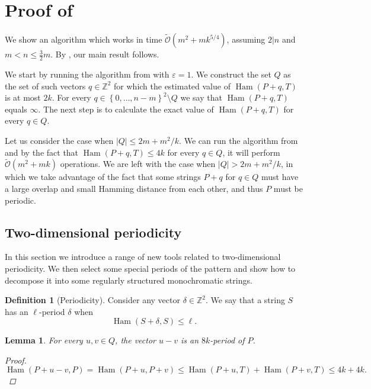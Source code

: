 \documentclass[11pt]{article}
\newcommand{\Z}{\mathbb{Z}}
\newcommand{\tO}{\tilde{\mathcal{O}}}
\newcommand{\set}[1]{\left\lbrace #1 \right\rbrace}
\theoremstyle{plain}
\newtheorem{lemma}{Lemma}
\theoremstyle{definition}
\newtheorem{definition}{Definition}
\theoremstyle{remark}
\DeclareMathOperator*{\Ham}{Ham}
\begin{document}
\section{Proof of }
We show an algorithm which works in time $\tO(m^2 + mk^{5/4})$, assuming $2|n$ and $m < n \le \frac{3}{2}m$.
By , our main result follows.

We start by running the algorithm from  with $\varepsilon = 1$.
We construct the set $Q$ as the set of such vectors $q \in \Z^2$ for which the estimated value of $\Ham(P + q, T)$ is at most $2k$.
For every $q \in \set{0, \dots, n - m}^2 \setminus Q$ we say that $\Ham(P + q, T)$ equals $\infty$.
The next step is to calculate the exact value of $\Ham(P + q, T)$ for every $q \in Q$.

Let us consider the case when $|Q| \le 2m + m^2/k$.
We can run the algorithm from  and by the fact that $\Ham(P + q, T) \le 4k$ for every $q \in Q$, it will perform $\tO(m^2 + mk)$ operations.
We are left with the case when $|Q| > 2m + m^2/k$, in which we take advantage of the fact that some strings $P + q$ for $q \in Q$ must have a large overlap and small Hamming distance from each other, and thus $P$ must be periodic.


\newcommand{\T}{\mathcal{T}}
\renewcommand{\S}{\mathcal{S}}
\renewcommand{\P}{\mathcal{P}}
\newcommand{\U}{\mathcal{U}}
\newcommand{\V}{\mathcal{V}}
\newcommand{\F}{\mathcal{F}}
\renewcommand{\L}{\mathcal{L}}


\subsection{Two-dimensional periodicity} \label{periodicity_section}
In this section we introduce a range of new tools related to two-dimensional periodicity.
We then select some special periods of the pattern and show how to decompose it into some regularly structured monochromatic strings.


\begin{definition}[Periodicity]
	Consider any vector $\delta \in \Z^2$.
	We say that a string $S$ has an $\ell$-period $\delta$ when
	$$ \Ham(S + \delta, S) \le \ell. $$
\end{definition}


\begin{lemma} \label{periodicity_lemma}
	For every $u, v \in Q$, the vector $u - v$ is an $8k$-period of $P$.
	\begin{proof}
		$\Ham(P + u - v, P) = \Ham(P + u, P + v) \le \Ham(P + u, T) + \Ham(P + v, T) \le 4k + 4k. $
	\end{proof}
\end{lemma}
\end{document}
